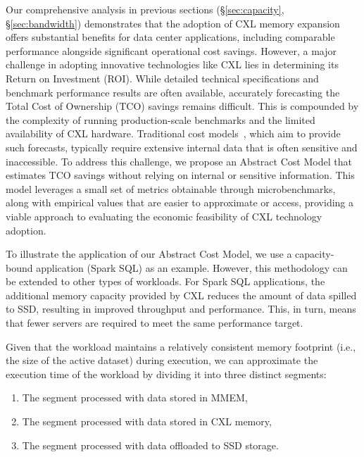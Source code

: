 Our comprehensive analysis in previous sections (\S\ref{sec:capacity}, \S\ref{sec:bandwidth}) demonstrates that the adoption of CXL memory expansion offers substantial benefits for data center applications, including comparable performance alongside significant operational cost savings. However, a major challenge in adopting innovative technologies like CXL lies in determining its Return on Investment (ROI). While detailed technical specifications and benchmark performance results are often available, accurately forecasting the Total Cost of Ownership (TCO) savings remains difficult. This is compounded by the complexity of running production-scale benchmarks and the limited availability of CXL hardware. Traditional cost models~\cite{CXLPoolCost}, which aim to provide such forecasts, typically require extensive internal data that is often sensitive and inaccessible. To address this challenge, we propose an Abstract Cost Model that estimates TCO savings without relying on internal or sensitive information. This model leverages a small set of metrics obtainable through microbenchmarks, along with empirical values that are easier to approximate or access, providing a viable approach to evaluating the economic feasibility of CXL technology adoption.

To illustrate the application of our Abstract Cost Model, we use a capacity-bound application (Spark SQL) as an example. However, this methodology can be extended to other types of workloads. For Spark SQL applications, the additional memory capacity provided by CXL reduces the amount of data spilled to SSD, resulting in improved throughput and performance. This, in turn, means that fewer servers are required to meet the same performance target.

Given that the workload maintains a relatively consistent memory footprint (i.e., the size of the active dataset) during execution, we can approximate the execution time of the workload by dividing it into three distinct segments:
\begin{enumerate}[leftmargin=*, itemsep=0pt]
  \item The segment processed with data stored in MMEM,
  \item The segment processed with data stored in CXL memory,
  \item The segment processed with data offloaded to SSD storage.
\end{enumerate}

